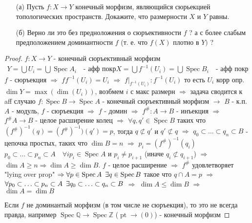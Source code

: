 \begin{prob}
\begin{itemize}
\item[]
\item[(а)] Пусть $f: X \rightarrow Y$ конечный морфизм, являющийся сюрьекцией топологических пространств. Докажите, что размерности $X$ и $Y$ равны.
\item[(б)] Верно ли это без предноложения о сюръективности $f$ ? а с более слабым предположением доминантности $f$ (т. е. что $f(X)$ плотно в $Y)$ ?
\end{itemize}
\end{prob}
\begin{proof}
$f: X \to Y$ - конечный сюръективный морфизм
\begin{gather*}
    Y = \bigcup U_i = \bigcup \operatorname{Spec} A_i\hspace{1em} \text{- афф покр}
    X = \bigcup f^{-1} (U_i) = \bigcup \operatorname{Spec} B_i\hspace{1em} \text{- афф покр}
\end{gather*}
$f$ - сюръекция $\Rightarrow$ $ff^{-1}(U_i) = U_i$ $\Rightarrow$ $f\big|_{f^{-1}(U_i)}: f^{-1}(U_i)$ то есть $U_i$ корр опр. $\dim Y = \max(\dim(U_i))$, возбмем $i$ с макс размерн $\Rightarrow$ задача сводится к aff случаю $f: \operatorname{Spec} B \rightarrow \operatorname{Spec} A$ - конечный сюръективный морфизм $\rightarrow$ $B$ - к.п. $A$ - модуль, $f$ - сюръекция $\Rightarrow$ $f$ - домин $\Rightarrow$ $f^{\#}: A \to B$ - инъекция $\Rightarrow$ $f^{\#} A \to B$ - целое расширение колец $\Rightarrow$ $\forall q, q'\in \operatorname{Spec} B$ таких что $(f^{\#})^{-1}(q) = (f^{\#})^{-1})(q') = p$, тогда $q \not\subset q'$ и $q'\not\subset q$ $\Rightarrow$ $q_0 \subset \ldots \subset q_n \subset B$ - цепочка простых, таких что $\dim B = n$ $\Rightarrow$ $p_i = (f^{\#})^{-1}(q_i)$ $p_0 \subset \ldots \subset p_n \subset A\hspace{1em} \forall i p_i \in \operatorname{Spec} A$ и $p_i \ne p_{i+1}$ (иначе $q_i \not\subset q_{i+1}$) $\Rightarrow$ $\dim A \geqslant n \Rightarrow \dim A \geqslant \dim B$. $f$ - целое расширение $\Rightarrow$ $f^{\#}$ удовлетворяет "lying over prop" $\Rightarrow \forall p \in \operatorname{Spec} A\hspace{0.5em} \exists q \in \operatorname{Spec} B$ такое что $q \cap A = p$ $\Rightarrow$ $\forall p_0 \subset \ldots \subset p_n \subset A\hspace{0.5em} \exists q_0 \subset \ldots \subset q_n \subset B$ $\Rightarrow$ $\dim A \leqslant \dim B$ $\Rightarrow$ $\dim A = \dim B$

Если $f$ не доминантый морфизм (в том числе не сюръекция), то это не всегда правда, например $\operatorname{Spec} \mathbb{Q} \to \operatorname{Spec} \mathbb{Z}$ ($\operatorname{pt} \to (0)$) - конечный морфизм
\end{proof}
\begin{comment}
\end{comment}
\newpage





